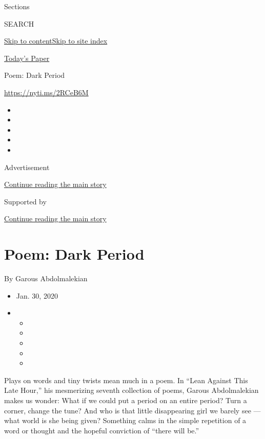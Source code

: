 Sections

SEARCH

\protect\hyperlink{site-content}{Skip to
content}\protect\hyperlink{site-index}{Skip to site index}

\href{https://myaccount.nytimes3xbfgragh.onion/auth/login?response_type=cookie\&client_id=vi}{}

\href{https://www.nytimes3xbfgragh.onion/section/todayspaper}{Today's
Paper}

Poem: Dark Period

\url{https://nyti.ms/2RCeB6M}

\begin{itemize}
\item
\item
\item
\item
\item
\end{itemize}

Advertisement

\protect\hyperlink{after-top}{Continue reading the main story}

Supported by

\protect\hyperlink{after-sponsor}{Continue reading the main story}

\hypertarget{poem-dark-period}{%
\section{Poem: Dark Period}\label{poem-dark-period}}

By Garous Abdolmalekian

\begin{itemize}
\item
  Jan. 30, 2020
\item
  \begin{itemize}
  \item
  \item
  \item
  \item
  \item
  \end{itemize}
\end{itemize}

Plays on words and tiny twists mean much in a poem. In ``Lean Against
This Late Hour,'' his mesmerizing seventh collection of poems, Garous
Abdolmalekian makes us wonder: What if we could put a period on an
entire period? Turn a corner, change the tune? And who is that little
disappearing girl we barely see --- what world is she being given?
Something calms in the simple repetition of a word or thought and the
hopeful conviction of ``there will be.''

